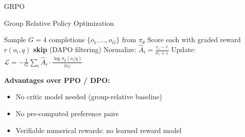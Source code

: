 \documentclass[aspectratio=169,10pt]{beamer}
\begin{document}
\begin{frame}{GRPO}
\begin{block}{Group Relative Policy Optimization}
\begin{algorithmic}[1]\small
    \State Sample $G\!=\!4$ completions $\{o_1, \ldots, o_G\}$ from $\pi_\theta$
    \State Score each with graded reward $r(o_i, q)$
     \textbf{skip} (DAPO filtering)
    \EndIf
    \State Normalize: $\hat{A}_i = \frac{r_i - \bar{r}}{\sigma_r + \varepsilon}$
    \State Update: $\mathcal{L} = -\frac{1}{G}\sum_i \hat{A}_i \cdot \frac{\log \pi_\theta(o_i|q)}{|o_i|}$
  \EndFor
\end{algorithmic}
\end{block}

\vspace{0.3em}
\textbf{Advantages over PPO / DPO:}
\begin{itemize}\small
  \item No critic model needed (group-relative baseline)
  \item No pre-computed preference pairs
  \item Verifiable numerical rewards: no learned reward model
\end{itemize}
\end{frame}
\end{document}
